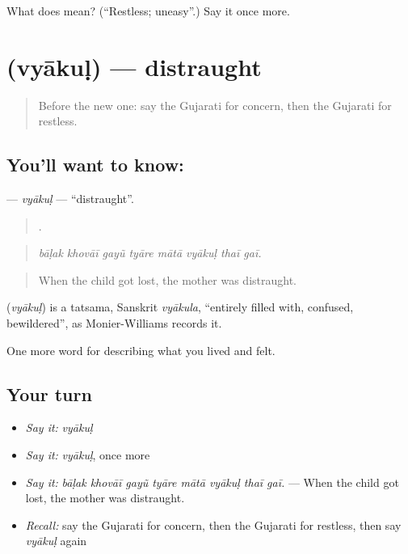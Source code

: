 \begin{tcolorbox}[breakable,colback=teal!4,colframe=teal!35!black,title={Before you move on}]
What does  mean? (\textquotedblleft{}Restless; uneasy\textquotedblright{}.) Say it once more.
\end{tcolorbox}
\section[\texorpdfstring{\gu{વ્યાકુળ} (vyākuḷ)}{વ્યાકુળ (vyākuḷ)}]{ (vyākuḷ) — distraught}

\label{lesson:GU-C454-vyakul}



\begin{quote}
Before the new one: say the Gujarati for concern, then the Gujarati for restless.
\end{quote}

\subsection*{You'll want to know: }
\textbf{} — \emph{vyākuḷ} — \textquotedblleft{}distraught\textquotedblright{}.

\begin{quote}
       .
\end{quote}

\begin{quote}
\emph{bāḷak khovāī gayũ tyāre mātā vyākuḷ thaī gaī.}
\end{quote}

\begin{quote}
When the child got lost, the mother was distraught.
\end{quote}

\begin{cousinweb}
\textbf{} (\emph{vyākuḷ}) is a tatsama, Sanskrit \emph{vyākula}, \textquotedblleft{}entirely filled with, confused, bewildered\textquotedblright{}, as Monier-Williams records it.
\end{cousinweb}

\begin{grammarlens}[title={What you've built}]
One more word for describing what you lived and felt.
\end{grammarlens}

\subsection*{Your turn}
\begin{itemize}
\raggedright
  \item \emph{Say it:} \emph{vyākuḷ}
  \item \emph{Say it:} \emph{vyākuḷ}, once more
  \item \emph{Say it:} \emph{bāḷak khovāī gayũ tyāre mātā vyākuḷ thaī gaī.} — When the child got lost, the mother was distraught.
  \item \emph{Recall:} say the Gujarati for concern, then the Gujarati for restless, then say \emph{vyākuḷ} again
\end{itemize}

